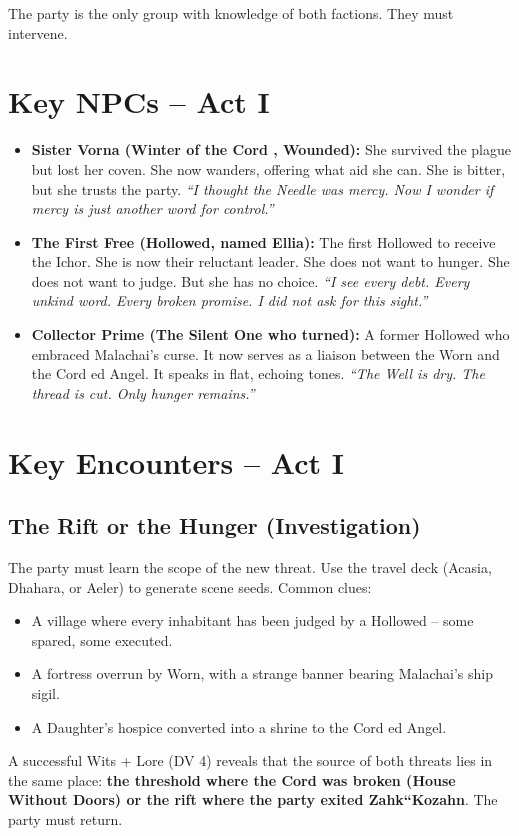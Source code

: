 \documentclass[10pt,twoside]{book}
\begin{document}
The party is the only group with knowledge of both factions. They must intervene.

\section{Key NPCs -- Act I}
\begin{itemize}
\item \textbf{Sister Vorna (Winter of the Cord , Wounded):} She survived the plague but lost her coven. She now wanders, offering what aid she can. She is bitter, but she trusts the party. \textit{``I thought the Needle was mercy. Now I wonder if mercy is just another word for control.''}
\item \textbf{The First Free (Hollowed, named Ellia):} The first Hollowed to receive the Ichor. She is now their reluctant leader. She does not want to hunger. She does not want to judge. But she has no choice. \textit{``I see every debt. Every unkind word. Every broken promise. I did not ask for this sight.''}
\item \textbf{Collector Prime (The Silent One who turned):} A former Hollowed who embraced Malachai's curse. It now serves as a liaison between the Worn and the Cord ed Angel. It speaks in flat, echoing tones. \textit{``The Well is dry. The thread is cut. Only hunger remains.''}
\end{itemize}

\section{Key Encounters -- Act I}

\subsection{The Rift or the Hunger (Investigation)}
The party must learn the scope of the new threat. Use the travel deck (Acasia, Dhahara, or Aeler) to generate scene seeds. Common clues:
\begin{itemize}
\item A village where every inhabitant has been judged by a Hollowed -- some spared, some executed.
\item A fortress overrun by Worn, with a strange banner bearing Malachai's ship sigil.
\item A Daughter's hospice converted into a shrine to the Cord ed Angel.
\end{itemize}

A successful Wits + Lore (DV 4) reveals that the source of both threats lies in the same place: \textbf{the threshold where the Cord was broken (House Without Doors) or the rift where the party exited Zahk``Kozahn}. The party must return.
\end{document}
